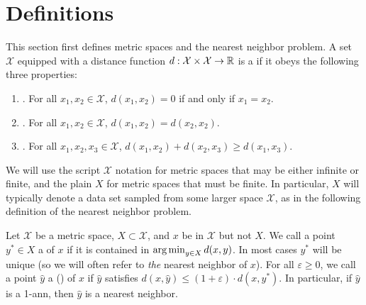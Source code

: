 \documentclass[thesis.tex]{subfiles}
\newcommand{\set}[1]{\mathcal {#1}}
\newcommand{\dist}[2]{\distf({#1},{#2})}
\newcommand{\distf}{d}
\begin{document}

\section{Definitions}
\label{sec:metric}

This section first defines metric spaces and the nearest neighbor problem.
%
A set $\set X$ equipped with a distance function $\distf : \set X \times \set X \to \R$ is a  if it obeys the following three properties:
\begin{enumerate}
    \item {}.  For all $x_1,x_2\in\set X$, $\dist{x_1}{x_2} = 0$ if and only if $x_1=x_2$.
    \item {}. For all $x_1,x_2\in\set X$, $\dist{x_1}{x_2} = \dist{x_2}{x_2}$.
    \item {}.  For all $x_1,x_2,x_3\in\set X$, $\dist{x_1}{x_2} + \dist{x_2}{x_3}\ge\dist{x_1}{x_3}$.
\end{enumerate}
We will use the script $\set X$ notation for metric spaces that may be either infinite or finite,
and the plain $X$ for metric spaces that must be finite.
In particular, $X$ will typically denote a data set sampled from some larger space $\set X$,
as in the following definition of the nearest neighbor problem.

Let $\set X$ be a metric space, $X\subset\set X$, and $x$ be in $\set X$ but not $X$.
We call a point $y^*\in X$ a  of $x$ if it is contained in $\argmin_{y\in X} \dist{x}{y}$.
In most cases $y^*$ will be unique 
(so we will often refer to \textit{the} nearest neighbor of $x$).
For all $\varepsilon \ge 0$,
we call a point $\hat y$ a  () of $x$ if $\hat y$ satisfies $\dist{x}{\hat y} \le (1+\varepsilon) \cdot\dist{x}{y^*}$.
In particular, if $\hat y$ is a 1-ann, then $\hat y$ is a nearest neighbor.
\end{document}
